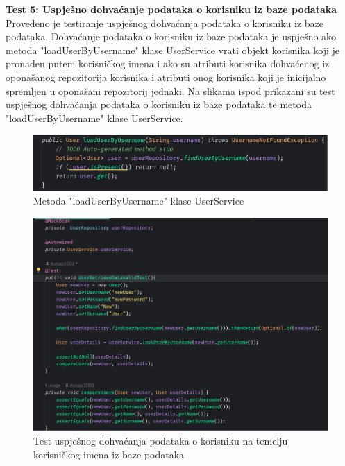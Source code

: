\textbf{Test 5: Uspješno dohvaćanje podataka o korisniku iz baze podataka} \\

Provedeno je testiranje uspješnog dohvaćanja podataka o korisniku iz baze podataka. Dohvaćanje podataka o korisniku iz baze podataka je uspješno ako metoda "loadUserByUsername" klase UserService vrati objekt korisnika koji je pronađen putem korisničkog imena i ako su atributi korisnika dohvaćenog iz oponašanog repozitorija korisnika i atributi onog korisnika koji je inicijalno spremljen u oponašani repozitorij jednaki. Na slikama ispod prikazani su test uspješnog dohvaćanja podataka o korisniku iz baze podataka te metoda "loadUserByUsername" klase UserService.

				\begin{figure}[H]
			\includegraphics[scale=0.4]{slike/loadUserByUsername.PNG} %
			\centering
			\caption{Metoda "loadUserByUsername" klase UserService}
			\label{Metoda "loadUserByUsername" klase UserService}
		\end{figure}
		
						\begin{figure}[H]
			\includegraphics[scale=0.4]{slike/userRetrieveDataValidTest.PNG} %
			\centering
			\caption{Test uspješnog dohvaćanja podataka o korisniku na temelju korisničkog imena iz baze podataka}
			\label{Test uspješnog dohvaćanja podataka o korisniku na temelju korisničkog imena iz baze podataka}
		\end{figure}
		
